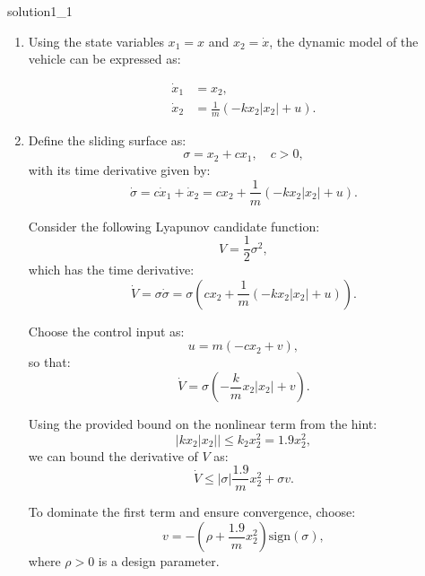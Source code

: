 \begin{solution}{}{solution1_1}
	\begin{enumerate}[label=\textbf{\alph*)}]
		\item Using the state variables \( x_1 = x \) and \( x_2 = \dot{x} \), the dynamic model of the vehicle can be expressed as:

		      \begin{equation*}
			      \begin{aligned}
				      \dot{x}_1 & = x_2,                                         \\
				      \dot{x}_2 & = \frac{1}{m} \left( -k x_2 |x_2| + u \right).
			      \end{aligned}
		      \end{equation*}

		\item Define the sliding surface as:
		      \[
			      \sigma = x_2 + c x_1, \quad c > 0,
		      \]
		      with its time derivative given by:
		      \[
			      \dot{\sigma} = c \dot{x}_1 + \dot{x}_2 = c x_2 + \frac{1}{m} \left( -k x_2 |x_2| + u \right).
		      \]

		      Consider the following Lyapunov candidate function:
		      \[
			      V = \frac{1}{2} \sigma^2,
		      \]
		      which has the time derivative:
		      \[
			      \dot{V} = \sigma \dot{\sigma} = \sigma \left( c x_2 + \frac{1}{m} \left( -k x_2 |x_2| + u \right) \right).
		      \]

		      Choose the control input as:
		      \[
			      u = m(-c x_2 + v),
		      \]
		      so that:
		      \[
			      \dot{V} = \sigma \left( -\frac{k}{m} x_2 |x_2| + v \right).
		      \]

		      Using the provided bound on the nonlinear term from the hint:
		      \[
			      |k x_2 |x_2|| \leq k_2 x_2^2 = 1.9 x_2^2,
		      \]
		      we can bound the derivative of \( V \) as:
		      \[
			      \dot{V} \leq |\sigma| \frac{1.9}{m} x_2^2 + \sigma v.
		      \]

		      To dominate the first term and ensure convergence, choose:
		      \[
			      v = -\left( \rho + \frac{1.9}{m} x_2^2 \right) \text{sign}(\sigma),
		      \]
		      where \( \rho > 0 \) is a design parameter.


\end{enumerate}
\end{solution}
